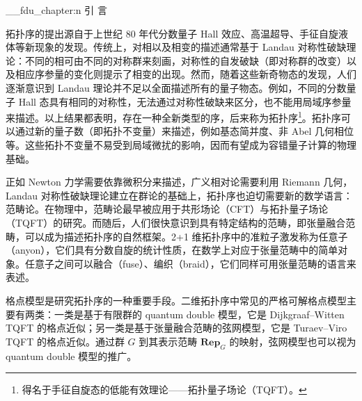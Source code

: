 \ExplSyntaxOn
\__fdu_chapter:n { 引 \quad 言 }
\ExplSyntaxOff

拓扑序\cite{wen1990topological,wen2013topological,wen2017colloquium,zeng2019introduction}的提出源自于上世纪 80 年代分数量子 Hall 效应\cite{tsui1982two,laughlin1983anomalous}、高温超导、手征自旋液体\cite{kalmeyer1987equivalence,wen1989chiral}等新现象的发现。传统上，对相以及相变的描述通常基于 Landau 对称性破缺理论：不同的相可由不同的对称群来刻画，对称性的自发破缺（即对称群的改变）以及相应序参量的变化则提示了相变的出现\cite{landau1980statistical,pathria2011statistical}。然而，随着这些新奇物态的发现，人们逐渐意识到 Landau 理论并不足以全面描述所有的量子物态。例如，不同的分数量子 Hall 态具有相同的对称性，无法通过对称性破缺来区分，也不能用局域序参量来描述\cite{stone1992quantum}。以上结果都表明，存在一种全新类型的序，后来称为拓扑序\footnote{得名于手征自旋态的低能有效理论——拓扑量子场论（TQFT）\cite{witten1989quantum}。}。拓扑序可以通过新的量子数（即拓扑不变量）来描述，例如基态简并度\cite{wen1989vacuum,wen1990ground}、非 Abel 几何相位\cite{wen1990topological}等。这些拓扑不变量不易受到局域微扰的影响，因而有望成为容错量子计算的物理基础\cite{kitaev2003fault,freedman2003topological,nayak2008nonabelian}。

正如 Newton 力学需要依靠微积分来描述，广义相对论需要利用 Riemann 几何，Landau 对称性破缺理论建立在群论的基础上，拓扑序也迫切需要新的数学语言：范畴论。在物理中，范畴论最早被应用于共形场论（CFT）\cite{segal1988definition,moore1989classical}与拓扑量子场论（TQFT）\cite{atiyah1988topological,turaev1992state}的研究。而随后，人们很快意识到具有特定结构的范畴，即张量融合范畴，可以成为描述拓扑序的自然框架\cite{levin2005string,kitaev2006anyons}。2+1 维拓扑序中的准粒子激发称为任意子（anyon），它们具有分数自旋的统计性质，在数学上对应于张量范畴中的简单对象。任意子之间可以融合（fuse）、编织（braid），它们同样可用张量范畴的语言来表述\cite{kong2014anyon,kong2014braided,kong2015boundary,lou2021dummy}。


格点模型是研究拓扑序的一种重要手段。二维拓扑序中常见的严格可解格点模型主要有两类：一类是基于有限群的 quantum double 模型\cite{kitaev2003fault,kitaev2006anyons}，它是 Dijkgraaf--Witten TQFT\cite{dijkgraaf1990topological} 的格点近似；另一类是基于张量融合范畴的弦网模型\cite{levin2005string}，它是 Turaev--Viro TQFT\cite{turaev1992state,kirillov2011string} 的格点近似。通过群 $G$ 到其表示范畴 $\mathbf{Rep}_G$ 的映射，弦网模型也可以视为 quantum double 模型的推广\cite{buerschaper2009mapping,buerschaper2013electric}。

